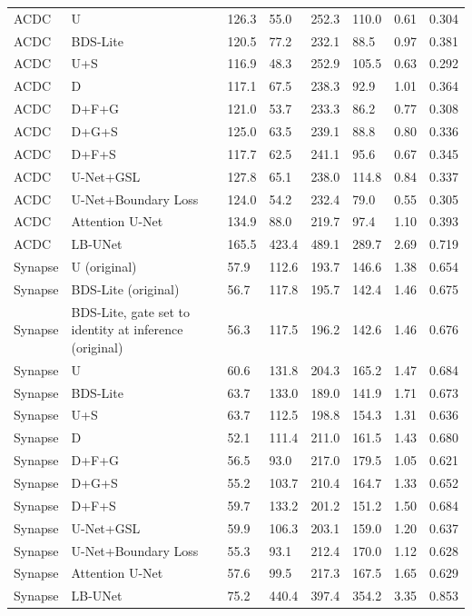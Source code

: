 \begin{longtable}{llllllll}
ACDC & U & 126.3 & 55.0 & 252.3 & 110.0 & 0.61 & 0.304 \\
ACDC & BDS-Lite & 120.5 & 77.2 & 232.1 & 88.5 & 0.97 & 0.381 \\
ACDC & U+S & 116.9 & 48.3 & 252.9 & 105.5 & 0.63 & 0.292 \\
ACDC & D & 117.1 & 67.5 & 238.3 & 92.9 & 1.01 & 0.364 \\
ACDC & D+F+G & 121.0 & 53.7 & 233.3 & 86.2 & 0.77 & 0.308 \\
ACDC & D+G+S & 125.0 & 63.5 & 239.1 & 88.8 & 0.80 & 0.336 \\
ACDC & D+F+S & 117.7 & 62.5 & 241.1 & 95.6 & 0.67 & 0.345 \\
ACDC & U-Net+GSL & 127.8 & 65.1 & 238.0 & 114.8 & 0.84 & 0.337 \\
ACDC & U-Net+Boundary Loss & 124.0 & 54.2 & 232.4 & 79.0 & 0.55 & 0.305 \\
ACDC & Attention U-Net & 134.9 & 88.0 & 219.7 & 97.4 & 1.10 & 0.393 \\
ACDC & LB-UNet & 165.5 & 423.4 & 489.1 & 289.7 & 2.69 & 0.719 \\
Synapse & U (original) & 57.9 & 112.6 & 193.7 & 146.6 & 1.38 & 0.654 \\
Synapse & BDS-Lite (original) & 56.7 & 117.8 & 195.7 & 142.4 & 1.46 & 0.675 \\
Synapse & BDS-Lite, gate set to identity at inference (original) & 56.3 & 117.5 & 196.2 & 142.6 & 1.46 & 0.676 \\
Synapse & U & 60.6 & 131.8 & 204.3 & 165.2 & 1.47 & 0.684 \\
Synapse & BDS-Lite & 63.7 & 133.0 & 189.0 & 141.9 & 1.71 & 0.673 \\
Synapse & U+S & 63.7 & 112.5 & 198.8 & 154.3 & 1.31 & 0.636 \\
Synapse & D & 52.1 & 111.4 & 211.0 & 161.5 & 1.43 & 0.680 \\
Synapse & D+F+G & 56.5 & 93.0 & 217.0 & 179.5 & 1.05 & 0.621 \\
Synapse & D+G+S & 55.2 & 103.7 & 210.4 & 164.7 & 1.33 & 0.652 \\
Synapse & D+F+S & 59.7 & 133.2 & 201.2 & 151.2 & 1.50 & 0.684 \\
Synapse & U-Net+GSL & 59.9 & 106.3 & 203.1 & 159.0 & 1.20 & 0.637 \\
Synapse & U-Net+Boundary Loss & 55.3 & 93.1 & 212.4 & 170.0 & 1.12 & 0.628 \\
Synapse & Attention U-Net & 57.6 & 99.5 & 217.3 & 167.5 & 1.65 & 0.629 \\
Synapse & LB-UNet & 75.2 & 440.4 & 397.4 & 354.2 & 3.35 & 0.853 \\
\bottomrule
\end{longtable}
